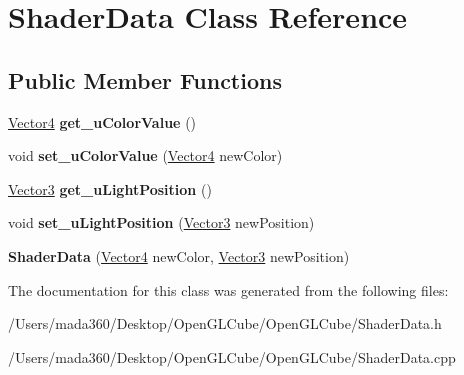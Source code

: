 \hypertarget{class_shader_data}{}\section{Shader\+Data Class Reference}
\label{class_shader_data}
\subsection*{Public Member Functions}
\begin{DoxyCompactItemize}
\item 
\hypertarget{class_shader_data_ae48da22f2d7e9321caebf6ef011159c9}{}\hyperlink{struct_vector4}{Vector4} {\bfseries get\+\_\+u\+Color\+Value} ()\label{class_shader_data_ae48da22f2d7e9321caebf6ef011159c9}

\item 
\hypertarget{class_shader_data_ac04cfe66917219212e4cead2cc116994}{}void {\bfseries set\+\_\+u\+Color\+Value} (\hyperlink{struct_vector4}{Vector4} new\+Color)\label{class_shader_data_ac04cfe66917219212e4cead2cc116994}

\item 
\hypertarget{class_shader_data_acefe94e40e6d383f4ced58895d2b70ca}{}\hyperlink{struct_vector3}{Vector3} {\bfseries get\+\_\+u\+Light\+Position} ()\label{class_shader_data_acefe94e40e6d383f4ced58895d2b70ca}

\item 
\hypertarget{class_shader_data_a2523c2d2ef2be6907dfbffbe8ea13226}{}void {\bfseries set\+\_\+u\+Light\+Position} (\hyperlink{struct_vector3}{Vector3} new\+Position)\label{class_shader_data_a2523c2d2ef2be6907dfbffbe8ea13226}

\item 
\hypertarget{class_shader_data_af7b50875bd341b954953f75f3faeaeeb}{}{\bfseries Shader\+Data} (\hyperlink{struct_vector4}{Vector4} new\+Color, \hyperlink{struct_vector3}{Vector3} new\+Position)\label{class_shader_data_af7b50875bd341b954953f75f3faeaeeb}

\end{DoxyCompactItemize}


The documentation for this class was generated from the following files\+:\begin{DoxyCompactItemize}
\item 
/\+Users/mada360/\+Desktop/\+Open\+G\+L\+Cube/\+Open\+G\+L\+Cube/Shader\+Data.\+h\item 
/\+Users/mada360/\+Desktop/\+Open\+G\+L\+Cube/\+Open\+G\+L\+Cube/Shader\+Data.\+cpp\end{DoxyCompactItemize}
